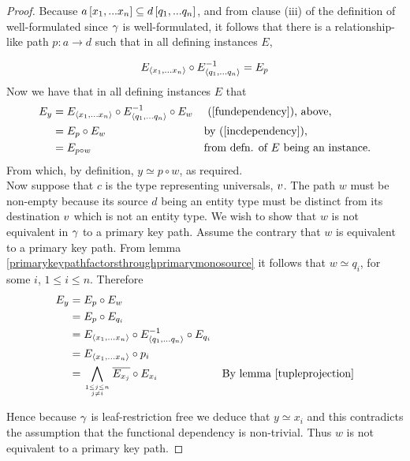 \begin{proof}
Because $a\left[x_1,...x_n\right]\subseteq d\left[q_1,...q_n\right]$,  and from
clause (iii) of the definition of well-formulated since $\gamma$ is well-formulated, it follows that
there  is a relationship-like path $p:a \rightarrow d$ such
that 
in all defining instances $E$,

\begin{equation}
\label{incdependency}
E_{\langle x_1,...x_n\rangle} \circ E^{-1}_{\langle q_1,...q_n\rangle} = E_p
\end{equation}
Now we have  that in all defining instances $E$ that 
\begin{align*}
E_y &= E_{\langle x_1,...x_n\rangle} \circ E_{\langle q_1,...q_n\rangle}^{-1} \circ E_w  && \text{ (\ref{fundependency}), above,}\\
    &= E_p \circ E_w                                   && \text{by (\ref{incdependency}),}\\
		&= E_{p \circ w}                                   && \text{from defn. of $E$ being an instance.}\\
\end{align*} 
\vspace{-0.3cm}
From which, by definition, $y\simeq p \circ w$, as required. \\

Now suppose that $c$ is the type representing universals, $v$. The path $w$ must be non-empty because its source $d$ being an entity type must be distinct from its destination $v$ which is not an entity type. 
We wish to show that $w$ is not equivalent in $\gamma$ to
a primary key path. Assume the contrary that $w$ is equivalent to a primary key path. From lemma 
\ref{primarykeypathfactorsthroughprimarymonosource} it follows that $w \simeq q_i$, for some
$i$, $1 \leq i \leq n$.  
Therefore
\begin{align*}
E_y &= E_p \circ E_w                                        && \text{}\\
		&= E_p \circ E_{q_i}                                      && \text{}\\
		&= E_{\xntuple} \circ E_{\qntuple}^{-1} \circ E_{q_i}     && \text{}\\
		&= E_{\xntuple} \circ p_i                                 && \text{} \\
		&= \bigwedge\limits_{\genfrac{}{}{0pt}{}{1 \leq j \leq n}{ j \neq i}}{\overline{E_{x_j}}}\circ E_{x_i}  
		                                                        && \text{By lemma \ref{tupleprojection}}
\end{align*} 

Hence because $\gamma$ is leaf-restriction free we deduce that $y \simeq x_i$ 
 and this contradicts the assumption that the functional dependency
is non-trivial. Thus $w$ is not equivalent to a primary key path.
\end{proof}

